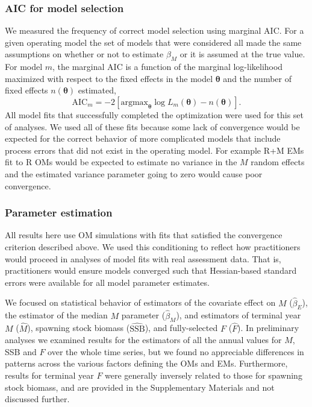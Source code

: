 \documentclass[
  12pt,
]{article}
\begin{document}
\hypertarget{aic-for-model-selection}{%
\subsubsection*{AIC for model selection}\label{aic-for-model-selection}}

We measured the frequency of correct model selection using marginal AIC. For a given operating model the set of models that were considered all made the same assumptions on whether or not to estimate \(\beta_M\) or it is assumed at the true value. For model \(m\), the marginal AIC is a function of the marginal log-likelihood maximized with respect to the fixed effects in the model \(\boldsymbol{\theta}\) and the number of fixed effects \(n\left(\boldsymbol{\theta}\right)\) estimated,
\[
\text{AIC}_m = -2\left[{\text{argmax}}_{\boldsymbol{\theta}} \log L_m\left({\boldsymbol{\theta}}\right) - n\left({\boldsymbol{\theta}}\right)\right].
\]
All model fits that successfully completed the optimization were used for this set of analyses. We used all of these fits because some lack of convergence would be expected for the correct behavior of more complicated models that include process errors that did not exist in the operating model. For example R+M EMs fit to R OMs would be expected to estimate no variance in the \(M\) random effects and the estimated variance parameter going to zero would cause poor convergence.

\hypertarget{parameter-estimation}{%
\subsubsection*{Parameter estimation}\label{parameter-estimation}}

All results here use OM simulations with fits that satisfied the convergence criterion described above. We used this conditioning to reflect how practitioners would proceed in analyses of model fits with real assessment data. That is, practitioners would ensure models converged such that Hessian-based standard errors were available for all model parameter estimates.

We focused on statistical behavior of estimators of the covariate effect on \(M\) (\(\widehat \beta_E\)), the estimator of the median \(M\) parameter (\(\widehat \beta_M\)), and estimators of terminal year \(M\) (\(\widehat M\)), spawning stock biomass (\(\widehat{\text{SSB}}\)), and fully-selected \(F\) (\(\widehat F\)). In preliminary analyses we examined results for the estimators of all the annual values for \(M\), SSB and \(F\) over the whole time series, but we found no appreciable differences in patterns across the various factors defining the OMs and EMs. Furthermore, results for terminal year \(F\) were generally inversely related to those for spawning stock biomass, and are provided in the Supplementary Materials and not discussed further.
\end{document}
